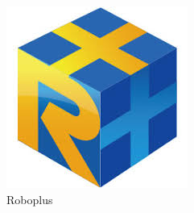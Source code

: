 {\begin{figure}
    \includegraphics[width=0.9\linewidth]{chapter3/images/roboplus/roboplus.jpg} 
    \caption*{Roboplus}
\end{figure}

}
